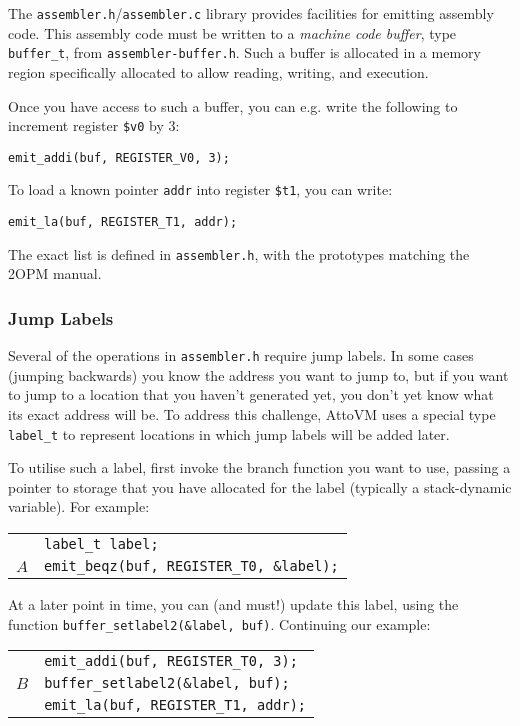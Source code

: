 \documentclass[11pt,a4paper]{article}
\newcommand{\Cty}[1]{\textcolor{dblue}{\texttt{#1}}}
\begin{document}
The \texttt{assembler.h}/\texttt{assembler.c} library provides
facilities for emitting assembly code.  This assembly code must be
written to a \emph{machine code buffer}, type \Cty{buffer\_t}, from
\texttt{assembler-buffer.h}.  Such a buffer is allocated in a memory region specifically
allocated to allow reading, writing, and execution.

Once you have access to such a buffer, you can e.g. write the following to increment
 register  \texttt{\$v0} by $3$:

\texttt{emit\_addi(buf, REGISTER\_V0, 3);}

To load a known pointer \texttt{addr} into  register \texttt{\$t1}, you can write:

\texttt{emit\_la(buf, REGISTER\_T1, addr);}

The exact list is defined in \texttt{assembler.h}, with the prototypes
matching the 2OPM manual.

\subsubsection{Jump Labels}
Several of the operations in \texttt{assembler.h} require jump labels.
In some cases (jumping backwards) you know the address you want to
jump to, but if you want to jump to a location that you haven't generated yet,
you don't yet know what its exact address will be.  To address this challenge,
AttoVM uses a special type \Cty{label\_t} to represent locations in which jump labels will be added later.

To utilise such a label, first invoke the branch function you want to use, passing a pointer to
storage that you have allocated for the label (typically a stack-dynamic variable).  For example:

\vspace{0.5cm}
\begin{tabular}{ll}
&\texttt{\Cty{label\_t} label;}\\
$A$&\texttt{emit\_beqz(buf, REGISTER\_T0, \&label);}\\
\end{tabular}
\vspace{0.5cm}

At a later point in time, you can (and must!) update this label, using
the function \texttt{buffer\_setlabel2(\&label, buf)}.  Continuing our example:

\vspace{0.5cm}

\begin{tabular}{ll}
&\texttt{emit\_addi(buf, REGISTER\_T0, 3);} \\
$B$&\texttt{buffer\_setlabel2(\&label, buf);} \\
&\texttt{emit\_la(buf, REGISTER\_T1, addr);} \\
\end{tabular}
\end{document}
